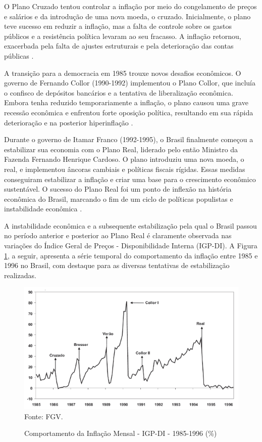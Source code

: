 \documentclass[12pt,oneside,a4paper,chapter=TITLE,english,brazil,sumario=abnt-6027-2012]{abntex2}
\begin{document}
O Plano Cruzado tentou controlar a inflação por meio do congelamento de preços e salários e da introdução de uma nova moeda, o cruzado. Inicialmente, o plano teve sucesso em reduzir a inflação, mas a falta de controle sobre os gastos públicos e a resistência política levaram ao seu fracasso. A inflação retornou, exacerbada pela falta de ajustes estruturais e pela deterioração das contas públicas \cite{fabiogiambiagi_1999_a}.

A transição para a democracia em 1985 trouxe novos desafios econômicos. O governo de Fernando Collor (1990-1992) implementou o Plano Collor, que incluía o confisco de depósitos bancários e a tentativa de liberalização econômica. Embora tenha reduzido temporariamente a inflação, o plano causou uma grave recessão econômica e enfrentou forte oposição política, resultando em sua rápida deterioração e na posterior hiperinflação \cite{lacerda_2010_economia}.

Durante o governo de Itamar Franco (1992-1995), o Brasil finalmente começou a estabilizar sua economia com o Plano Real, liderado pelo então Ministro da Fazenda Fernando Henrique Cardoso. O plano introduziu uma nova moeda, o real, e implementou âncoras cambiais e políticas fiscais rígidas. Essas medidas conseguiram estabilizar a inflação e criar uma base para o crescimento econômico sustentável. O sucesso do Plano Real foi um ponto de inflexão na história econômica do Brasil, marcando o fim de um ciclo de políticas populistas e instabilidade econômica \cite{lacerda_2010_economia}.

A instabilidade econômica e a subsequente estabilização pela qual o Brasil passou no período anterior e posterior ao Plano Real é claramente observada nas variações do Índice Geral de Preços - Disponibilidade Interna (IGP-DI). A Figura \ref{fig:igpdi}, a seguir, apresenta a série temporal do comportamento da inflação entre 1985 e 1996 no Brasil, com destaque para as diversas tentativas de estabilização realizadas.

\begin{figure}[H]
	
	\caption{Comportamento da Inflação Mensal - IGP-DI - 1985-1996 (\%)}
	
	\includegraphics[]{fig/igp-di.png}\\
	
	\footnotesize Fonte: FGV.
	
	\label{fig:igpdi}
	
\end{figure}
\end{document}
